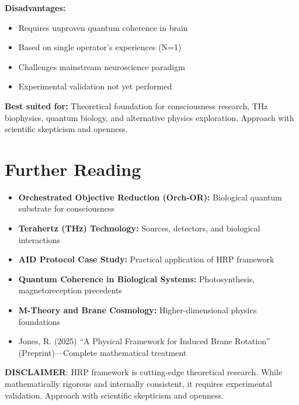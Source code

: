 \textbf{Disadvantages:}
\begin{itemize}
\item Requires unproven quantum coherence in brain
\item Based on single operator's experiences (N=1)
\item Challenges mainstream neuroscience paradigm
\item Experimental validation not yet performed
\end{itemize}

\textbf{Best suited for:} Theoretical foundation for consciousness research, THz biophysics, quantum biology, and alternative physics exploration. Approach with scientific skepticism and openness.

\section{Further Reading}

\begin{itemize}
\item \textbf{Orchestrated Objective Reduction (Orch-OR):} Biological quantum substrate for consciousness
\item \textbf{Terahertz (THz) Technology:} Sources, detectors, and biological interactions
\item \textbf{AID Protocol Case Study:} Practical application of HRP framework
\item \textbf{Quantum Coherence in Biological Systems:} Photosynthesis, magnetoreception precedents
\item \textbf{M-Theory and Brane Cosmology:} Higher-dimensional physics foundations
\item Jones, R. (2025) ``A Physical Framework for Induced Brane Rotation'' (Preprint)---Complete mathematical treatment
\end{itemize}

\vspace{1em}

\textbf{DISCLAIMER}: HRP framework is cutting-edge theoretical research. While mathematically rigorous and internally consistent, it requires experimental validation. Approach with scientific skepticism and openness.
